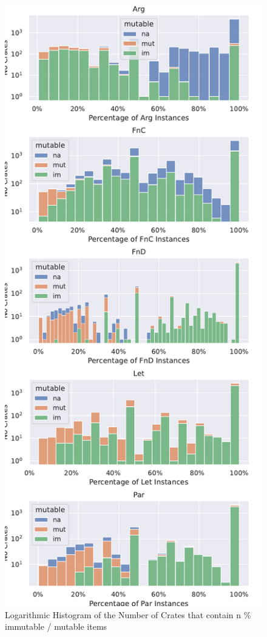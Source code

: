 \documentclass[twoside, english]{sdqthesis}
\theoremstyle{definition}
\begin{document}
\begin{figure}[h]
	\centering
	\includegraphics[width=0.5\linewidth, clip, trim={0.2cm 0.2cm 0.2cm 0.2cm}]{../hist-mutability.pdf}
	\caption{Logarithmic Histogram of the Number of Crates that contain n \% immutable / mutable items}
	\label{fig:mutability-hist}
\end{figure}
\end{document}
